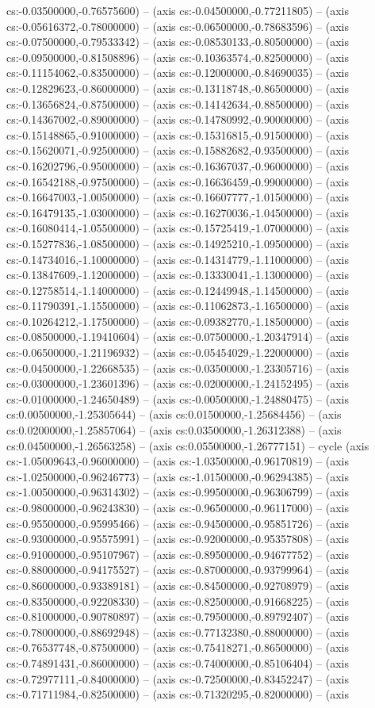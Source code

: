 cs:-0.03500000,-0.76575600) -- (axis cs:-0.04500000,-0.77211805) -- (axis cs:-0.05616372,-0.78000000) -- (axis cs:-0.06500000,-0.78683596) -- (axis cs:-0.07500000,-0.79533342) -- (axis cs:-0.08530133,-0.80500000) -- (axis cs:-0.09500000,-0.81508896) -- (axis cs:-0.10363574,-0.82500000) -- (axis cs:-0.11154062,-0.83500000) -- (axis cs:-0.12000000,-0.84690035) -- (axis cs:-0.12829623,-0.86000000) -- (axis cs:-0.13118748,-0.86500000) -- (axis cs:-0.13656824,-0.87500000) -- (axis cs:-0.14142634,-0.88500000) -- (axis cs:-0.14367002,-0.89000000) -- (axis cs:-0.14780992,-0.90000000) -- (axis cs:-0.15148865,-0.91000000) -- (axis cs:-0.15316815,-0.91500000) -- (axis cs:-0.15620071,-0.92500000) -- (axis cs:-0.15882682,-0.93500000) -- (axis cs:-0.16202796,-0.95000000) -- (axis cs:-0.16367037,-0.96000000) -- (axis cs:-0.16542188,-0.97500000) -- (axis cs:-0.16636459,-0.99000000) -- (axis cs:-0.16647003,-1.00500000) -- (axis cs:-0.16607777,-1.01500000) -- (axis cs:-0.16479135,-1.03000000) -- (axis cs:-0.16270036,-1.04500000) -- (axis cs:-0.16080414,-1.05500000) -- (axis cs:-0.15725419,-1.07000000) -- (axis cs:-0.15277836,-1.08500000) -- (axis cs:-0.14925210,-1.09500000) -- (axis cs:-0.14734016,-1.10000000) -- (axis cs:-0.14314779,-1.11000000) -- (axis cs:-0.13847609,-1.12000000) -- (axis cs:-0.13330041,-1.13000000) -- (axis cs:-0.12758514,-1.14000000) -- (axis cs:-0.12449948,-1.14500000) -- (axis cs:-0.11790391,-1.15500000) -- (axis cs:-0.11062873,-1.16500000) -- (axis cs:-0.10264212,-1.17500000) -- (axis cs:-0.09382770,-1.18500000) -- (axis cs:-0.08500000,-1.19410604) -- (axis cs:-0.07500000,-1.20347914) -- (axis cs:-0.06500000,-1.21196932) -- (axis cs:-0.05454029,-1.22000000) -- (axis cs:-0.04500000,-1.22668535) -- (axis cs:-0.03500000,-1.23305716) -- (axis cs:-0.03000000,-1.23601396) -- (axis cs:-0.02000000,-1.24152495) -- (axis cs:-0.01000000,-1.24650489) -- (axis cs:-0.00500000,-1.24880475) -- (axis cs:0.00500000,-1.25305644) -- (axis cs:0.01500000,-1.25684456) -- (axis cs:0.02000000,-1.25857064) -- (axis cs:0.03500000,-1.26312388) -- (axis cs:0.04500000,-1.26563258) -- (axis cs:0.05500000,-1.26777151) -- cycle (axis cs:-1.05009643,-0.96000000) -- (axis cs:-1.03500000,-0.96170819) -- (axis cs:-1.02500000,-0.96246773) -- (axis cs:-1.01500000,-0.96294385) -- (axis cs:-1.00500000,-0.96314302) -- (axis cs:-0.99500000,-0.96306799) -- (axis cs:-0.98000000,-0.96243830) -- (axis cs:-0.96500000,-0.96117000) -- (axis cs:-0.95500000,-0.95995466) -- (axis cs:-0.94500000,-0.95851726) -- (axis cs:-0.93000000,-0.95575991) -- (axis cs:-0.92000000,-0.95357808) -- (axis cs:-0.91000000,-0.95107967) -- (axis cs:-0.89500000,-0.94677752) -- (axis cs:-0.88000000,-0.94175527) -- (axis cs:-0.87000000,-0.93799964) -- (axis cs:-0.86000000,-0.93389181) -- (axis cs:-0.84500000,-0.92708979) -- (axis cs:-0.83500000,-0.92208330) -- (axis cs:-0.82500000,-0.91668225) -- (axis cs:-0.81000000,-0.90780897) -- (axis cs:-0.79500000,-0.89792407) -- (axis cs:-0.78000000,-0.88692948) -- (axis cs:-0.77132380,-0.88000000) -- (axis cs:-0.76537748,-0.87500000) -- (axis cs:-0.75418271,-0.86500000) -- (axis cs:-0.74891431,-0.86000000) -- (axis cs:-0.74000000,-0.85106404) -- (axis cs:-0.72977111,-0.84000000) -- (axis cs:-0.72500000,-0.83452247) -- (axis cs:-0.71711984,-0.82500000) -- (axis cs:-0.71320295,-0.82000000) -- (axis 